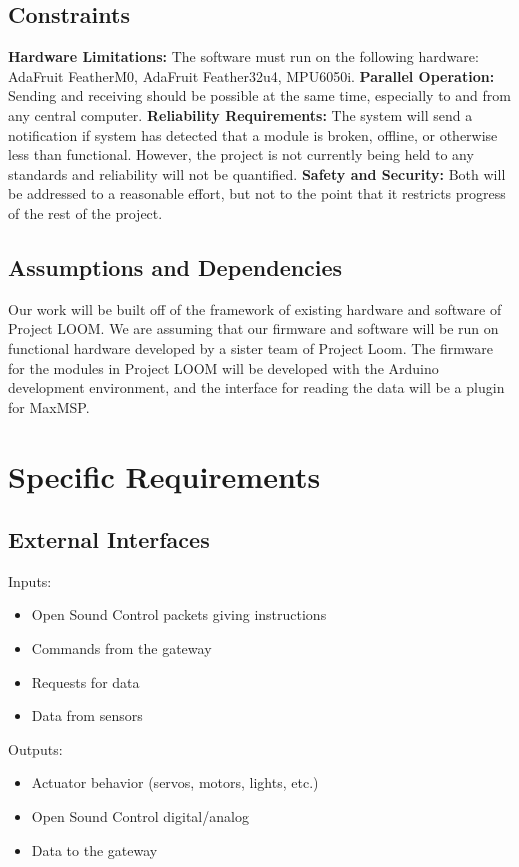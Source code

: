 \documentclass[onecolumn, draftclsnofoot,10pt, compsoc]{IEEEtran}
\begin{document}
	\subsection{Constraints}
		\textbf{Hardware Limitations:} The software must run on the following hardware: AdaFruit FeatherM0, AdaFruit Feather32u4, MPU6050i. \newline
		\textbf{Parallel Operation:} Sending and receiving should be possible at the same time, especially to and from any central computer. \newline
		\textbf{Reliability Requirements:} The system will send a notification if system has detected that a module is broken, offline, or otherwise less than functional. However, the project is not currently being held to any standards and reliability will not be quantified. \newline
		\textbf{Safety and Security:} Both will be addressed to a reasonable effort, but not to the point that it restricts progress of the rest of the project.
	
	\subsection{Assumptions and Dependencies}
	Our work will be built off of the framework of existing hardware and software of Project LOOM. We are assuming that our firmware and software will be run on functional hardware developed by a sister team of Project Loom. The firmware for the modules in Project LOOM will be developed with the Arduino development environment, and the interface for reading the data will be a plugin for MaxMSP.

\section{Specific Requirements}
	\subsection{External Interfaces}
	Inputs: 
	\begin{itemize}
		\item Open Sound Control packets giving instructions
		\item Commands from the gateway
		\item Requests for data
		\item Data from sensors
	\end{itemize}
	Outputs: 
	\begin{itemize}
		\item Actuator behavior (servos, motors, lights, etc.)
		\item Open Sound Control digital/analog 
		\item Data to the gateway
	\end{itemize}
	
\end{document}
